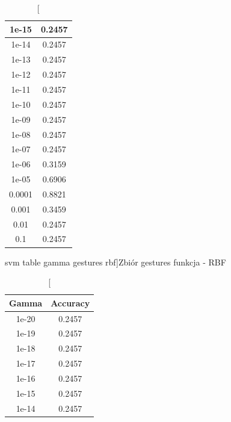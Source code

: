 \documentclass{classrep}
\begin{document}
{{\begin{table}[!htbp]
\begin{minipage}{.3\textwidth}
\begin{tabular}{|c|c|}
                        1e-15 & 0.2457 \\ \hline
                        1e-14 & 0.2457 \\ \hline
                        1e-13 & 0.2457 \\ \hline
                        1e-12 & 0.2457 \\ \hline
                        1e-11 & 0.2457 \\ \hline
                        1e-10 & 0.2457 \\ \hline
                        1e-09 & 0.2457 \\ \hline
                        1e-08 & 0.2457 \\ \hline
                        1e-07 & 0.2457 \\ \hline
                        1e-06 & 0.3159 \\ \hline
                        1e-05 & 0.6906 \\ \hline
                        0.0001 & 0.8821 \\ \hline
                        0.001 & 0.3459 \\ \hline
                        0.01 & 0.2457 \\ \hline
                        0.1 & 0.2457 \\ \hline
                    \end{tabular}
                    \caption
                    [svm table gamma gestures rbf]{Zbiór gestures funkcja - RBF}
                    \label{svn_table_gamma_gestures _rbf}
                \end{minipage}
                \hfill
                \begin{minipage}{.3\textwidth}
                    \centering
                    \begin{tabular}{|c|c|}
                        \hline
                        Gamma & Accuracy \\ \hline
                        1e-20 & 0.2457 \\ \hline
                        1e-19 & 0.2457 \\ \hline
                        1e-18 & 0.2457 \\ \hline
                        1e-17 & 0.2457 \\ \hline
                        1e-16 & 0.2457 \\ \hline
                        1e-15 & 0.2457 \\ \hline
                        1e-14 & 0.2457 \\ \hline

\end{tabular}
\end{minipage}
\end{table}}}
\end{document}
